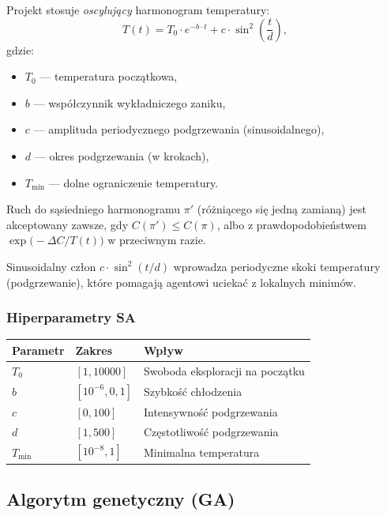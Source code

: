 \documentclass[11pt,a4paper]{article}
\begin{document}
Projekt stosuje \emph{oscylujący} harmonogram temperatury:
\begin{equation}
  T(t) = T_0 \cdot e^{-b \cdot t} + c \cdot \sin^2\!\left(\frac{t}{d}\right),
  \label{eq:temperature}
\end{equation}
gdzie:
\begin{itemize}[noitemsep]
  \item $T_0$ — temperatura początkowa,
  \item $b$ — współczynnik wykładniczego zaniku,
  \item $c$ — amplituda periodycznego podgrzewania (sinusoidalnego),
  \item $d$ — okres podgrzewania (w krokach),
  \item $T_{\min}$ — dolne ograniczenie temperatury.
\end{itemize}

Ruch do sąsiedniego harmonogramu $\pi'$ (różniącego się jedną zamianą) jest
akceptowany zawsze, gdy $C(\pi') \leq C(\pi)$, albo z prawdopodobieństwem
$\exp\!\bigl(-\Delta C / T(t)\bigr)$ w przeciwnym razie.

Sinusoidalny człon $c \cdot \sin^2(t/d)$ wprowadza periodyczne skoki
temperatury (podgrzewanie), które pomagają agentowi uciekać z lokalnych
minimów.

\subsubsection*{Hiperparametry SA}

\begin{center}
\begin{tabular}{@{}lll@{}}
\toprule
\textbf{Parametr} & \textbf{Zakres} & \textbf{Wpływ} \\
\midrule
$T_0$      & $[1, 10000]$   & Swoboda eksploracji na początku \\
$b$        & $[10^{-6}, 0{,}1]$ & Szybkość chłodzenia \\
$c$        & $[0, 100]$     & Intensywność podgrzewania \\
$d$        & $[1, 500]$     & Częstotliwość podgrzewania \\
$T_{\min}$ & $[10^{-8}, 1]$ & Minimalna temperatura \\
\bottomrule
\end{tabular}
\end{center}

\subsection{Algorytm genetyczny (GA)}
\end{document}
